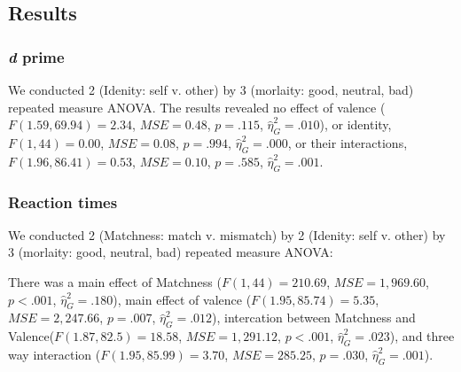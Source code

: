 \documentclass[man]{apa6}
\begin{document}
\hypertarget{results-7}{%
\subsection{Results}\label{results-7}}

\hypertarget{d-prime}{%
\subsubsection{\texorpdfstring{\emph{d} prime}{d prime}}\label{d-prime}}

We conducted 2 (Idenity: self v. other) by 3 (morlaity: good, neutral, bad) repeated measure ANOVA. The results revealed no effect of valence (\(F(1.59, 69.94) = 2.34\), \(\mathit{MSE} = 0.48\), \(p = .115\), \(\hat{\eta}^2_G = .010\)), or identity, \(F(1, 44) = 0.00\), \(\mathit{MSE} = 0.08\), \(p = .994\), \(\hat{\eta}^2_G = .000\), or their interactions, \(F(1.96, 86.41) = 0.53\), \(\mathit{MSE} = 0.10\), \(p = .585\), \(\hat{\eta}^2_G = .001\).

\hypertarget{reaction-times}{%
\subsubsection{Reaction times}\label{reaction-times}}

We conducted 2 (Matchness: match v. mismatch) by 2 (Idenity: self v. other) by 3 (morlaity: good, neutral, bad) repeated measure ANOVA:

There was a main effect of Matchness (\(F(1, 44) = 210.69\), \(\mathit{MSE} = 1,969.60\), \(p < .001\), \(\hat{\eta}^2_G = .180\)), main effect of valence (\(F(1.95, 85.74) = 5.35\), \(\mathit{MSE} = 2,247.66\), \(p = .007\), \(\hat{\eta}^2_G = .012\)), intercation between Matchness and Valence(\(F(1.87, 82.5) = 18.58\), \(\mathit{MSE} = 1,291.12\), \(p < .001\), \(\hat{\eta}^2_G = .023\)), and three way interaction (\(F(1.95, 85.99) = 3.70\), \(\mathit{MSE} = 285.25\), \(p = .030\), \(\hat{\eta}^2_G = .001\)).
\end{document}
